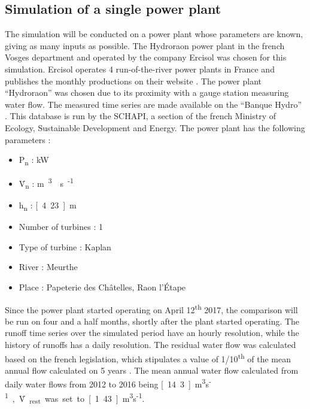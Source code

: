 \subsection{Simulation of a single power plant}
\label{sub:metho_single}
The simulation will be conducted on a power plant whose parameters are known, giving as many inputs as possible. The Hydroraon power plant in the french Vosges department and operated by the company Ercisol was chosen for this simulation. Ercisol operates 4 run-of-the-river power plants in France and publishes the monthly productions on their website \cite{ercisol}. The power plant ``Hydroraon'' was chosen due to its proximity with a gauge station measuring water flow. The measured time series are made available on the ``Banque Hydro'' \cite{eaufrance}. This database is run by the SCHAPI, a section of the french Ministry of Ecology, Sustainable Development and Energy. \newline
The power plant has the following parameters :
\begin{itemize}
\itemsep0em
 \item P\textsubscript{n} \tabto{4cm}: \unit[400]{kW}
 \item \.V\textsubscript{n} \tabto{4cm}: \unit[12]{m\textsuperscript{3}\textperiodcentered s\textsuperscript{-1}}
 \item h\textsubscript{n} \tabto{4cm}: \unit[4.23]{m}
 \item Number of turbines \tabto{4cm}: 1
 \item Type of turbine \tabto{4cm}: Kaplan
 \item River \tabto{4cm}: Meurthe
 \item Place \tabto{4cm}: Papeterie des Châtelles, Raon l'Étape
\end{itemize}
Since the power plant started operating on April 12\textsuperscript{th} 2017, the comparison will be run on four and a half months, shortly after the plant started operating. The runoff time series over the simulated period have an hourly resolution, while the history of runoffs has a daily resolution. The residual water flow was calculated based on the french legislation, which stipulates a value of 1/10\textsuperscript{th} of the mean annual flow calculated on 5 years \cite{sage}. The mean annual water flow calculated from daily water flows from 2012 to 2016 being \unit[14.3]{m\textsuperscript{3}\textperiodcentered s\textsuperscript{-1}}, \.V\textsubscript{rest} was set to \unit[1.43]{m\textsuperscript{3}\textperiodcentered s\textsuperscript{-1}}.

